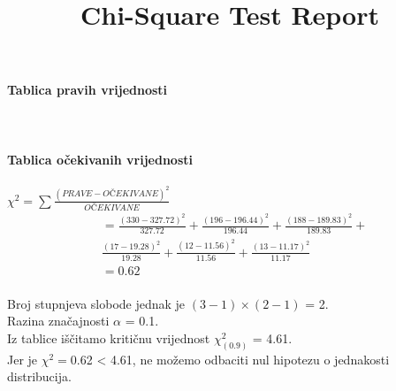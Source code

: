 \documentclass{article}%
\begin{document}
%
\normalsize%
\title{Chi-Square Test Report}%
\renewcommand{\arraystretch}{1.5}%
\textbf{\huge Tablica pravih vrijednosti\\}%
%
\\\\\\%
\renewcommand{\arraystretch}{1.5}%
\textbf{\huge Tablica očekivanih vrijednosti}\\%
%
\vspace{10pt}%
\\[1em]%
\Large $\chi^2 = \sum \frac{(PRAVE - OČEKIVANE)^2}{OČEKIVANE}$%
\\[1em]%
\begin{equation*}%
\begin{aligned}%
&=%
 \frac{(330 - 327.72)^2}{327.72} +%
 \frac{(196 - 196.44)^2}{196.44} +%
 \frac{(188 - 189.83)^2}{189.83} + \\&%
 \frac{(17 - 19.28)^2}{19.28} +%
 \frac{(12 - 11.56)^2}{11.56} +%
 \frac{(13 - 11.17)^2}{11.17} \\&%
=0.62%
\end{aligned}%
\end{equation*}%
\vspace{10pt}%
\\[1em]%
\Large Broj stupnjeva slobode jednak je $(3 - 1) \times (2 - 1)$ = 2.%
\\%
\Large Razina značajnosti $\alpha$ = 0.1.%
\\%
\Large Iz tablice iščitamo kritičnu vrijednost $\chi^2_{(0.9)}$ = 4.61.%
\\%
\Large Jer je $\chi^2=$0.62 < 4.61, ne možemo odbaciti nul hipotezu o jednakosti distribucija.%
\end{document}
